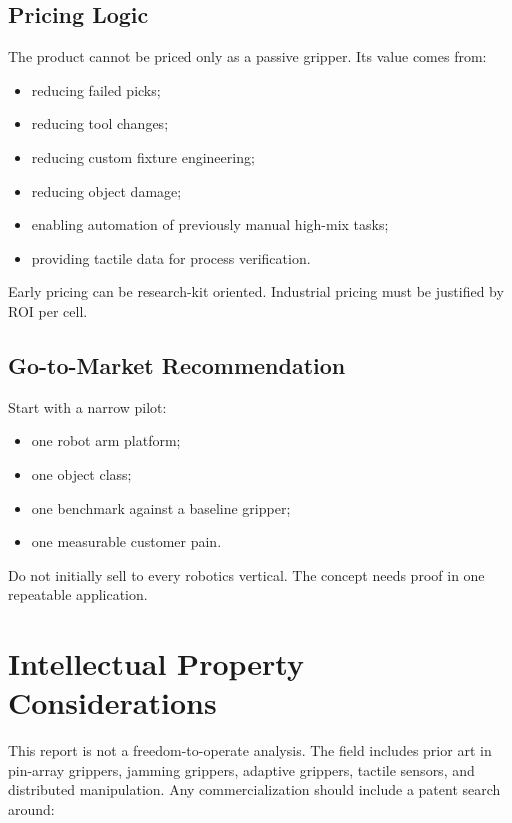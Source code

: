 \documentclass[11pt]{article}
\begin{document}
\subsection{Pricing Logic}

The product cannot be priced only as a passive gripper. Its value comes from:

\begin{itemize}[leftmargin=*]
  \item reducing failed picks;
  \item reducing tool changes;
  \item reducing custom fixture engineering;
  \item reducing object damage;
  \item enabling automation of previously manual high-mix tasks;
  \item providing tactile data for process verification.
\end{itemize}

Early pricing can be research-kit oriented. Industrial pricing must be justified by ROI per cell.

\subsection{Go-to-Market Recommendation}

Start with a narrow pilot:

\begin{itemize}[leftmargin=*]
  \item one robot arm platform;
  \item one object class;
  \item one benchmark against a baseline gripper;
  \item one measurable customer pain.
\end{itemize}

Do not initially sell to every robotics vertical. The concept needs proof in one repeatable application.

\section{Intellectual Property Considerations}

This report is not a freedom-to-operate analysis. The field includes prior art in pin-array grippers, jamming grippers, adaptive grippers, tactile sensors, and distributed manipulation. Any commercialization should include a patent search around:
\end{document}
